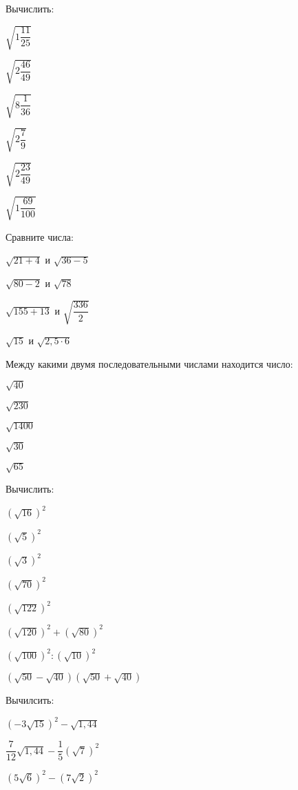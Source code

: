 \begin{class}[number=2]
\begin{listofex}
		\item Вычислить:
		\begin{enumcols}[itemcolumns=6]
			\item \( \sqrt{1\dfrac{11}{25}} \)
			\item \( \sqrt{2\dfrac{46}{49}} \)
			\item \( \sqrt{8\dfrac{1}{36}} \)
			\item \( \sqrt{2\dfrac{7}{9}} \)
			\item \( \sqrt{2\dfrac{23}{49}} \)
			\item \( \sqrt{1\dfrac{69}{100}} \)
		\end{enumcols}
		\item Сравните числа: 
		\begin{enumcols}[itemcolumns=2]
			\item \( \sqrt{21+4} \) и \( \sqrt{36-5} \)
			\item \( \sqrt{80-2} \) и \( \sqrt{78} \)
			\item \( \sqrt{155+13} \) и \( \sqrt{\dfrac{336}{2}} \)
			\item \( \sqrt{15} \) и \( \sqrt{2,5\cdot6} \)
		\end{enumcols}
		\item Между какими двумя последовательными числами находится число:
		\begin{enumcols}[itemcolumns=5]
			\item \( \sqrt{40} \)
			\item \( \sqrt{230} \)
			\item \( \sqrt{1400} \)
			\item \( \sqrt{30} \)
			\item \( \sqrt{65} \)
		\end{enumcols}	
		\item Вычислить:
		\begin{enumcols}[itemcolumns=2]
			\item \( (\sqrt{16})^2 \)
			\item \( (\sqrt{5})^2 \)
			\item \( (\sqrt{3})^2 \)
			\item \( (\sqrt{70})^2 \)
			\item \( (\sqrt{122})^2 \)
			\item \( (\sqrt{120})^2+(\sqrt{80})^2 \)
			\item \( (\sqrt{100})^2:(\sqrt{10})^2 \)
			\item \( (\sqrt{50}-\sqrt{40})(\sqrt{50}+\sqrt{40}) \)
		\end{enumcols}
		\item Вычилсить:
		\begin{enumcols}[itemcolumns=3]
			\item \( (-3\sqrt{15})^2-\sqrt{1,44} \)
			\item \( \dfrac{7}{12}\sqrt{1,44}-\dfrac{1}{5}(\sqrt{7})^2 \)
			\item \( (5\sqrt{6})^2-(7\sqrt{2})^2 \)
		\end{enumcols}
	\end{listofex}
\end{class}
